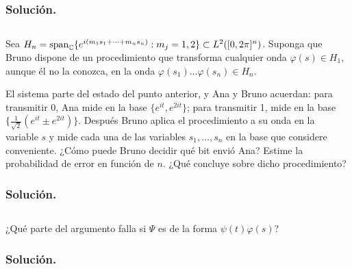 \documentclass[12pt]{article}
\begin{document}
\color{Black}

\subsubsection*{Solución.}




\color{rojoUN}

\subsection{}

Sea $H_n = \text{span}_{\mathbb{C}}\{e^{i(m_1 s_1 + \dots + m_n s_n)} : m_j = 1,2\} \subset L^2([0,2\pi]^n)$. Suponga que Bruno dispone de un procedimiento que transforma cualquier onda $\varphi(s) \in H_1$, aunque él no la conozca, en la onda $\varphi(s_1)\dots\varphi(s_n) \in H_n$.

    El sistema parte del estado del punto anterior, y Ana y Bruno acuerdan: para transmitir 0, Ana mide en la base $\{e^{it}, e^{2it}\}$; para transmitir 1, mide en la base $\{\frac{1}{\sqrt{2}}(e^{it} \pm e^{2it})\}$. Después Bruno aplica el procedimiento a su onda en la variable $s$ y mide cada una de las variables $s_1, \dots, s_n$ en la base que considere conveniente. ¿Cómo puede Bruno decidir qué bit envió Ana? Estime la probabilidad de error en función de $n$. ¿Qué concluye sobre dicho procedimiento?

\color{Black}

\subsubsection*{Solución.}




\color{rojoUN}

\subsection{}

¿Qué parte del argumento falla si $\Psi$ es de la forma $\psi(t)\varphi(s)$?

\color{Black}

\subsubsection*{Solución.}



\end{document}
